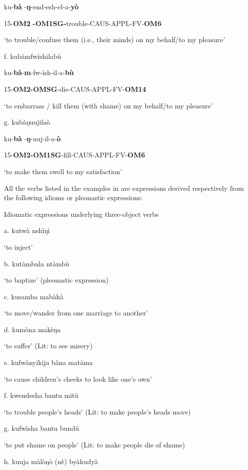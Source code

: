 \documentclass[output=paper]{langscibook}
\begin{document}
ku-\textbf{bà}  {}-\textbf{ŋ}{{}-end-esh-el-a-\textbf{yò}}

{15-\textbf{OM2}  \textbf{{}-OM1SG-}trouble-CAUS-APPL-FV-\textbf{OM6}}

{‘to trouble/confuse them (i.e., their minds) on my behalf/to my pleasure’}

f.  kubà{mfwìshilabù}

ku-\textbf{bà}{}-{\textbf{m}{}-fw-ìsh-il-a-\textbf{bù}}

{15-\textbf{OM2-OMSG}{}-die-CAUS-APPL-FV-\textbf{OM14}}

{‘to embarrass / kill them (with shame) on my behalf/to my pleasure’}

g.  kubàŋ{uujilaò}

ku-\textbf{bà}  {}-\textbf{ŋ}{{}-uuj-il-a-\textbf{ò}}

{15-\textbf{OM2-OM1SG}{}-fill-CAUS-APPL-FV-\textbf{OM6}}

{‘to make them swell to my satisfaction’}

All the verbs listed in the examples in  are expressions derived respectively from the following idioms or pleonastic expressions:

\ea%
    \label{ex:lukusa:31}
    \z

          Idiomatic expressions underlying three-object verbs

a.  kutwà nshìŋì            

\glt ‘to inject’

b.  kutàmbula ntàmbù        

\glt ‘to baptize’ (pleonastic expression)

c.  kusamba mabàkà          

\glt ‘to move/wander from one marriage to another’

d.   kumòna makèŋa          

\glt ‘to suffer’ (Lit: to see misery)

e.  kufwànyikija bâna matàma  

\glt ‘to cause children’s cheeks to look like one’s own’

f.  kwendesha bantu mitù      

\glt ‘to trouble people’s heads’ (Lit: to make people’s heads move)

g.  kufwìsha bantu bundù      

\glt ‘to put shame on people’ (Lit: to make people die of shame)

h.  kuuja màlòŋò (nè) byàkudyà  
\end{document}
